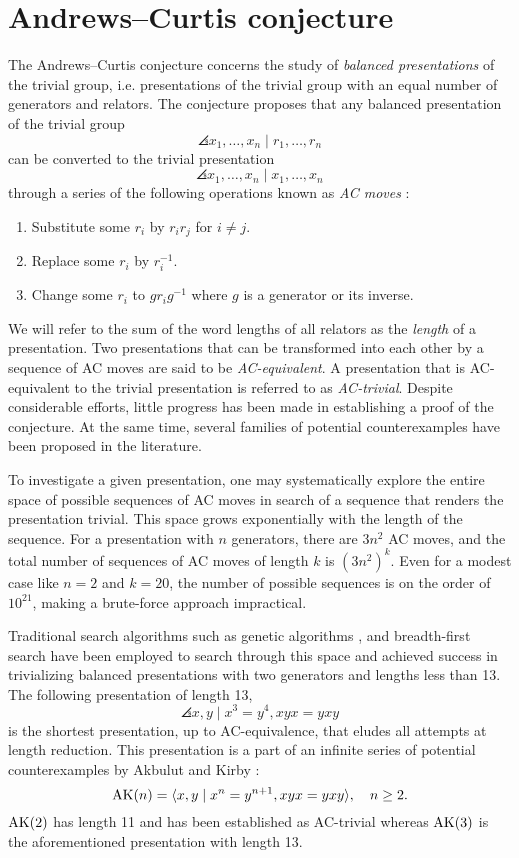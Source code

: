 
\section{Andrews--Curtis conjecture\label{sec:AC}}

The Andrews--Curtis conjecture concerns the study of \textit{balanced presentations} of the trivial group, i.e.
presentations of the trivial group with an equal number of generators and relators.
The conjecture proposes that any balanced presentation of the trivial group
\[
\angles{x_1, \dots, x_n \mid r_1, \dots, r_n}
\]
can be converted to the trivial presentation
\[
\angles{x_1, \dots, x_n \mid x_1, \dots, x_n}
\]
through a series of the following operations known as \textit{AC moves} \cite{Andrews--Curtis}:
\begin{enumerate}[label=(AC\arabic*)]
	\item Substitute some $r_i$ by $r_i r_j$ for $i \neq j$.
	\item Replace some $r_i$ by $r_i^{-1}$.
	\item Change some $r_i$ to $g r_i g^{-1}$ where $g$ is a generator or its inverse.
\end{enumerate}

We will refer to the sum of the word lengths of all relators as the \textit{length} of a presentation.
Two presentations that can be transformed into each other by a sequence of AC moves are said to be \textit{AC-equivalent}.
A presentation that is AC-equivalent to the trivial presentation is referred to as \textit{AC-trivial}.
Despite considerable efforts, little progress has been made in establishing a proof of the conjecture.
At the same time, several families of potential counterexamples have been proposed in the literature.

To investigate a given presentation, one may systematically explore the entire space of possible sequences of AC moves in search of a sequence that renders the presentation trivial.
This space grows exponentially with the length of the sequence.
For a presentation with $n$ generators, there are $3n^2$ AC moves, and the total number of sequences of AC moves of length $k$ is $(3n^2)^k$.
Even for a modest case like $n=2$ and $k=20$, the number of possible sequences is on the order of $10^{21}$, making a brute-force approach impractical.

Traditional search algorithms such as genetic algorithms \cite{genetic}, and breadth-first search \cite{bfs-ac} have been employed to search through this space and achieved success in trivializing balanced presentations with two generators and lengths less than 13.
The following presentation of length 13,
\[
\angles{x, y \mid x^3 = y^4, xyx = yxy}
\]
is the shortest presentation, up to AC-equivalence, that eludes all attempts at length reduction.
This presentation is a part of an infinite series of potential counterexamples by Akbulut and Kirby \cite{Akbulut--Kirby}:
\[
\text{AK}(n) = \langle x, y \mid x^n = y^{n+1}, xyx = yxy\rangle, \quad n \geq 2.
\]
$\text{AK}(2)$ has length 11 and has been established as AC-trivial \cite{genetic} whereas $\text{AK}(3)$ is the aforementioned presentation with length 13.

